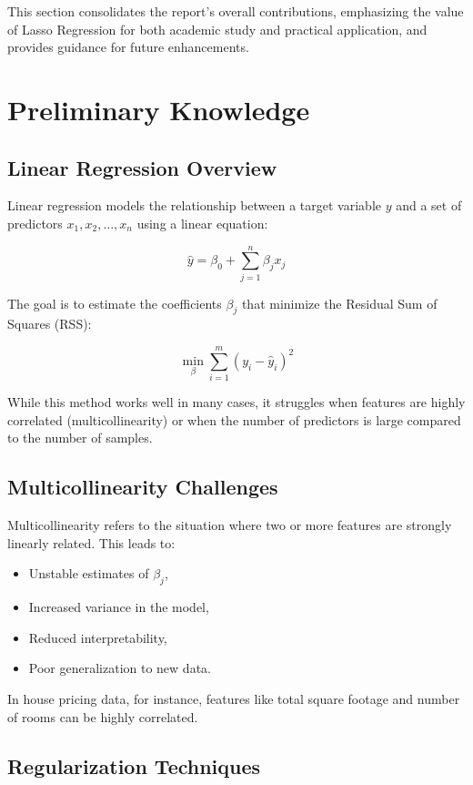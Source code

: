 \documentclass[12pt, a4paper]{report}
\begin{document}
This section consolidates the report’s overall contributions, emphasizing the value of Lasso Regression for both academic study and practical application, and provides guidance for future enhancements.
\chapter{Preliminary Knowledge}
\section{ Linear Regression Overview}

Linear regression models the relationship between a target variable \( y \) and a set of predictors \( x_1, x_2, \ldots, x_n \) using a linear equation:

\[
\hat{y} = \beta_0 + \sum_{j=1}^{n} \beta_j x_j
\]

The goal is to estimate the coefficients \( \beta_j \) that minimize the Residual Sum of Squares (RSS):

\[
\min_{\beta} \sum_{i=1}^{m} (y_i - \hat{y}_i)^2
\]

While this method works well in many cases, it struggles when features are highly correlated (multicollinearity) or when the number of predictors is large compared to the number of samples.

\section{ Multicollinearity Challenges}

Multicollinearity refers to the situation where two or more features are strongly linearly related. This leads to:

\begin{itemize}
    \item Unstable estimates of \( \beta_j \),
    \item Increased variance in the model,
    \item Reduced interpretability,
    \item Poor generalization to new data.
\end{itemize}

In house pricing data, for instance, features like total square footage and number of rooms can be highly correlated.

\section{ Regularization Techniques}
\end{document}
